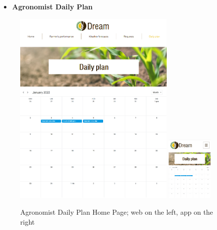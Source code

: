\documentclass{article}
\begin{document}
    
    \begin{itemize}
        \item \textbf{Agronomist Daily Plan}
    \end{itemize}
        \begin{figure} [h]
            \centering
            \includegraphics[width=0.7\textwidth]{images/UserInterfaces/Agronomist/DailyPlan/DailyPlanHomePageWeb.png}
            \quad
            \includegraphics[width=0.2\textwidth]{images/UserInterfaces/Agronomist/DailyPlan/DailyPlanHomePageApp.png}
            \quad
            \caption{\label{fig:agronomistDPHomePage}Agronomist Daily Plan Home Page; web on the left, app on the right}
        \end{figure}
        \newpage
\end{document}
